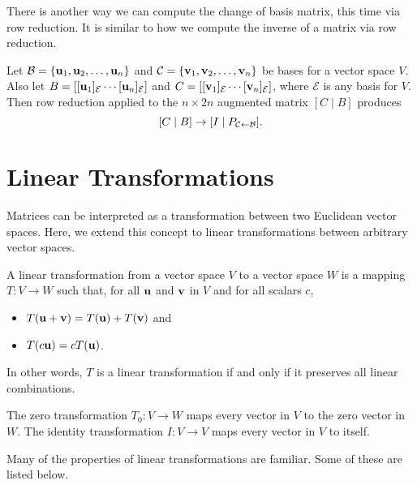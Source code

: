 \documentclass[../m073main.tex]{subfiles}
\begin{document}
There is another way we can compute the change of basis matrix, this time via row reduction.
It is similar to how we compute the inverse of a matrix via row reduction.

\begin{theorem}
	Let $\mathcal{B} = \{\mathbf{u}_1, \mathbf{u}_2, \ldots, \mathbf{u}_n\}$ and $\mathcal{C} = \{\mathbf{v}_1, \mathbf{v}_2, \ldots, \mathbf{v}_n\}$ be bases for a vector space $V$.
	Also let $B = [[\mathbf{u}_1]_{\mathcal{E}} \cdots [\mathbf{u}_n]_{\mathcal{E}}]$ and $C = [[\mathbf{v}_1]_{\mathcal{E}} \cdots [\mathbf{v}_n]_{\mathcal{E}}]$, where $\mathcal{E}$ is any basis for $V$.
	Then row reduction applied to the $n \times 2n$ augmented matrix $[C \;|\; B]$ produces
	\[ [C \;|\; B] \to [I \;|\; P_{\mathcal{C} \leftarrow \mathcal{B}}]. \]
\end{theorem}

\section{Linear Transformations}
Matrices can be interpreted as a transformation between two Euclidean vector spaces.
Here, we extend this concept to linear transformations between arbitrary vector spaces.

\begin{definition}
	A linear transformation from a vector space $V$ to a vector space $W$ is a mapping $T : V \to W$ such that, for all $\mathbf{u}$ and $\mathbf{v}$ in $V$ and for all scalars $c$,
	\begin{multicols}{2}
		\begin{itemize}[topsep=0pt]
			\item $T(\mathbf{u} + \mathbf{v}) = T(\mathbf{u}) + T(\mathbf{v})$ and
			\item $T(c \mathbf{u}) = cT(\mathbf{u})$.
		\end{itemize}
	\end{multicols}
	In other words, $T$ is a linear transformation if and only if it preserves all linear combinations.
\end{definition}

\begin{definition}
	The zero transformation $T_0 : V \to W$ maps every vector in $V$ to the zero vector in $W$.
	The identity transformation $I : V \to V$ maps every vector in $V$ to itself.
\end{definition}

Many of the properties of linear transformations are familiar.
Some of these are listed below.
\end{document}
